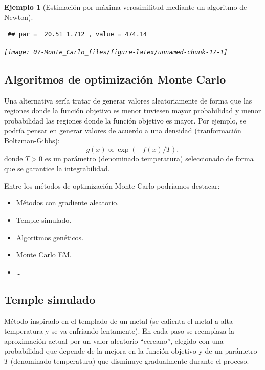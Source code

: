 \documentclass[
  10pt,
]{book}
\theoremstyle{break}
\newtheorem{example}{Ejemplo}[chapter]
\theoremstyle{nonumberplain}
\begin{document}
\begin{example}[Estimación por máxima verosimilitud mediante un algoritmo de Newton]
\begin{verbatim}
 ## par =  20.51 1.712 , value = 474.14
\end{verbatim}

\begin{center}\texttt{[image: 07-Monte\_Carlo\_files/figure-latex/unnamed-chunk-17-1]} \end{center}

\end{example}

\hypertarget{algoritmos-de-optimizaciuxf3n-monte-carlo}{%
\subsection{Algoritmos de optimización Monte Carlo}\label{algoritmos-de-optimizaciuxf3n-monte-carlo}}

Una alternativa sería tratar de generar valores aleatoriamente de forma que las regiones donde la función objetivo es menor tuviesen mayor probabilidad y menor probabilidad las regiones donde la función objetivo es mayor.
Por ejemplo, se podría pensar en generar valores de acuerdo a una densidad (tranformación Boltzman-Gibbs):
\[g(x)\propto \exp \left( -f(x)/T\right) ,\]
donde \(T>0\) es un parámetro (denominado temperatura) seleccionado de forma que se garantice la integrabilidad.

Entre los métodos de optimización Monte Carlo podríamos destacar:

\begin{itemize}
\item
  Métodos con gradiente aleatorio.
\item
  Temple simulado.
\item
  Algoritmos genéticos.
\item
  Monte Carlo EM.
\item
  \ldots{}
\end{itemize}

\hypertarget{temple-simulado}{%
\subsection{Temple simulado}\label{temple-simulado}}

Método inspirado en el templado de un metal (se calienta el metal a alta temperatura y se va enfriando lentamente).
En cada paso se reemplaza la aproximación actual por un valor aleatorio ``cercano'', elegido con una probabilidad que depende de la mejora en la función objetivo y de un parámetro \(T\) (denominado temperatura) que disminuye gradualmente durante el proceso.
\end{document}
